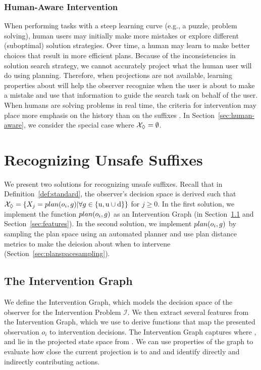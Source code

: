 \subsubsection{Human-Aware Intervention}
When performing tasks with a steep learning curve (e.g., a puzzle, problem solving), 
human users may initially make more mistakes or explore different (suboptimal) solution strategies. 
Over time, a human may learn to make better choices that result in more efficient plans. 
Because of the inconsistencies in solution search strategy, we cannot accurately project what the human user will do using planning.
Therefore, when projections are not available, learning properties about \historyDef will help the observer recognize when the user is about to make a mistake and use that information to guide the search task on behalf of the user.
When humans are solving problems in real time, the criteria for intervention
may place more emphasis on the history \historyDef than on the suffixes \Suffixes.
In Section~\ref{sec:human-aware}, we consider the special case where $\mathcal{X}_\Diamond = \emptyset$.
%
%
\section{Recognizing Unsafe Suffixes}
\label{sec:recognizing-unsafe-suffixes}
We present two solutions for recognizing unsafe suffixes. 
Recall that in Definition~\ref{def:standard}, the observer's decision space \Suffixes is derived such that $\mathcal{X}_\Diamond = \{ X_j = plan( o_i, g) | \forall g \in \{\mathrm{u}, \mathrm{u}\cup\mathrm{d}\} \}$ for $j \geq 0$. 
In the first solution, we implement the function $plan( o_i, g)$ as an Intervention Graph (in Section~\ref{sec:intervention-graph}
and Section~\ref{sec:features}). 
In the second solution, we implement $plan( o_i, g)$ by sampling the plan space using an automated planner and use plan distance metrics to make the deicsion about when to intervene (Section~\ref{sec:planspacesampling}).


\subsection{The Intervention Graph}
\label{sec:intervention-graph}

We define the Intervention Graph, which models the decision space of the observer for the Intervention Problem $\mathcal{I}$.
We then extract several features from the  Intervention Graph, which we use to derive functions that map the presented observation $o_i$ to intervention decisions. 
The Intervention Graph captures where \undesired, and \dandu lie in the projected state space from \historyEndState. 
We can use properties of the graph to evaluate how close the current projection \historyDef is to \undesired and \dandu and identify directly and indirectly contributing actions.


